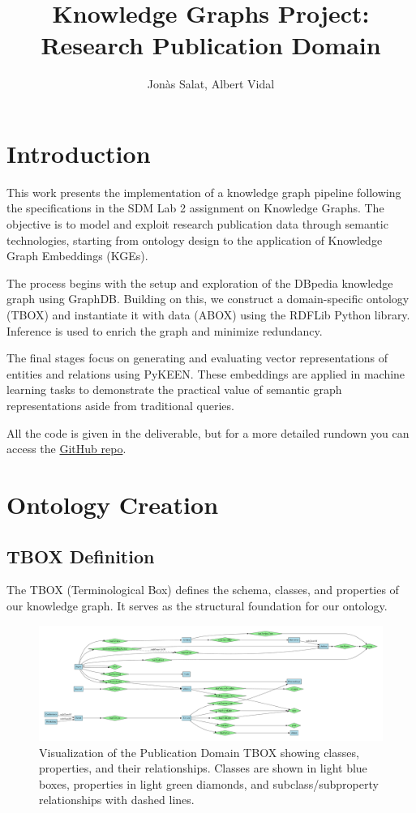 \documentclass[10pt,a4paper]{article}
\title{Knowledge Graphs Project: Research Publication Domain}
\author{Jonàs Salat, Albert Vidal}
\begin{document}
\maketitle

\section{Introduction}

This work presents the implementation of a knowledge graph pipeline following the specifications in the SDM Lab 2 assignment on Knowledge Graphs. The objective is to model and exploit research publication data through semantic technologies, starting from ontology design to the application of Knowledge Graph Embeddings (KGEs).

The process begins with the setup and exploration of the DBpedia knowledge graph using GraphDB. Building on this, we construct a domain-specific ontology (TBOX) and instantiate it with data (ABOX) using the RDFLib Python library. Inference is used to enrich the graph and minimize redundancy.

The final stages focus on generating and evaluating vector representations of entities and relations using PyKEEN. These embeddings are applied in machine learning tasks to demonstrate the practical value of semantic graph representations aside from traditional queries.

All the code is given in the deliverable, but for a more detailed rundown you can access the \href{https://github.com/Quiracle/MDS-SDM-Proj2-SalatVidal}{GitHub repo}.

\section{Ontology Creation}
\subsection{TBOX Definition}
The TBOX (Terminological Box) defines the schema, classes, and properties of our knowledge graph. It serves as the structural foundation for our ontology.

\begin{figure}[H]
    \centering
    \includegraphics[width=\textwidth]{img/publication_tbox.pdf}
    \caption{Visualization of the Publication Domain TBOX showing classes, properties, and their relationships. Classes are shown in light blue boxes, properties in light green diamonds, and subclass/subproperty relationships with dashed lines.}
    \label{fig:tbox}
\end{figure}
\end{document}
